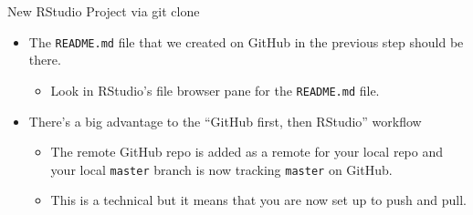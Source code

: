 \documentclass[
  ignorenonframetext,
]{beamer}
\providecommand{\tightlist}{%
  \setlength{\itemsep}{0pt}\setlength{\parskip}{0pt}}
\begin{document}
\begin{frame}[fragile]{New RStudio Project via git clone}
\protect\hypertarget{new-rstudio-project-via-git-clone-1}{}

\begin{itemize}
\tightlist
\item
  The \texttt{README.md} file that we created on GitHub in the previous
  step should be there.

  \begin{itemize}
  \tightlist
  \item
    Look in RStudio's file browser pane for the \texttt{README.md} file.
  \end{itemize}
\item
  There's a big advantage to the ``GitHub first, then RStudio'' workflow

  \begin{itemize}
  \tightlist
  \item
    The remote GitHub repo is added as a remote for your local repo and
    your local \texttt{master} branch is now tracking \texttt{master} on
    GitHub.
  \item
    This is a technical but it means that you are now set up to push and
    pull.
  \end{itemize}
\end{itemize}

\end{frame}
\end{document}

